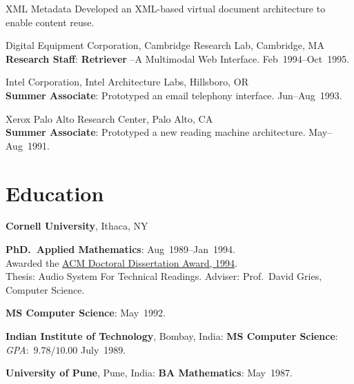 \documentclass{article}
\begin{document}
\begin{compactitem}
\begin{compactdesc}
  
\item[XML Metadata] Developed an XML-based virtual document
  architecture to enable  content reuse.
\end{compactdesc}
\item   {Digital Equipment Corporation},  {Cambridge Research Lab}, Cambridge, MA\\
  \textbf{Research Staff}: \textbf{Retriever} --A Multimodal Web
  Interface.  \hfill Feb~1994--Oct~1995.
\item {Intel Corporation}, {Intel Architecture Labs},
  Hillsboro, OR\\
  \textbf{Summer Associate}: Prototyped an email telephony
  interface. \hfill Jun--Aug~1993.
\item {Xerox Palo Alto Research Center}, Palo Alto, CA\\
  \textbf{Summer Associate}: Prototyped a new reading machine
  architecture. \hfill May--Aug~1991.
\end{compactitem}



\section*{Education}

\begin{compactitem}
\item \textbf{Cornell University}, Ithaca, NY
\begin{compactitem}
\item \textbf{PhD.\ Applied Mathematics}: \hfill
  Aug~1989--Jan~1994.\\
  \hspace*{.1in} Awarded the
\href{http://www.acm.org/awards/dd_citation/1994B.html}{%
  ACM Doctoral Dissertation Award, 1994}.\\
\hspace*{.1in} {Thesis}: {Audio System For Technical Readings}.
 {Adviser}: Prof.\  David Gries, Computer Science.
\item \textbf{MS Computer Science}: \hfill May~1992.
\end{compactitem}
\item \textbf{Indian Institute of Technology}, Bombay, India:
  \textbf{MS Computer Science}: \textit{GPA\/}:~$9.78/10.00$
  \hfill July~1989.
\item \textbf{University of Pune}, Pune, India: \textbf{BA
    Mathematics}: \hfill May~1987.
\end{compactitem}
\end{document}
